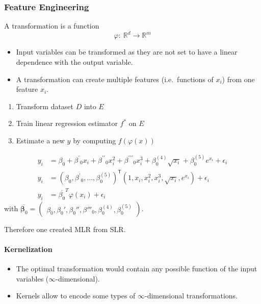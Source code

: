 \subsubsection{Feature Engineering}

A transformation is a function
\begin{equation*}
    \varphi{:}\:\mathbb{R}^d\to\mathbb{R}^m
\end{equation*}

\begin{itemize}
    \item Input variables can be transformed as they are not set to have a linear dependence with the output variable.
    \item A transformation can create multiple features (i.e.\ functions of $x_i$) from one feature $x_i$.
\end{itemize}


\begin{enumerate}
    \item Transform dataset $D$ into $E$
    \item Train linear regression estimator $f^*$ on $E$
    \item Estimate a new $y$ by computing $f(\varphi(x))$
\end{enumerate}


\noindent\begin{align*}
    y_i & =\beta_0+\beta^{\prime}{}_0x_i+\beta^{\prime\prime}{}_0x_i^2+\beta^{\prime\prime\prime}{}_0x_i^3+\beta_0^{(4)}\sqrt{x_i}+\beta_0^{(5)}e^{x_i}+\epsilon_i \\
    y_i & ={\left(\beta_0,\beta^{\prime}{}_0,\dots,\beta_0^{(5)}\right)}^{\mathsf{T}}\left(1,x_i,x_i^2,x_i^3,\sqrt{x_i},e^{x_i}\right)+\epsilon_i                  \\
    y_i & =\overline{\beta_0}^T\varphi(x_i)+\epsilon_i
\end{align*}
with $\overline{\boldsymbol{\beta}_0}=\begin{pmatrix}\beta_0,\beta_0',\beta_0'',\beta'''_0,\beta_0^{(4)},\beta_0^{(5)}\end{pmatrix}$. %

Therefore one created MLR from SLR.

\paragraph{Kernelization}
\begin{itemize}
    \item The optimal transformation would contain any possible function of the input variables ($\infty$-dimensional).
    \item Kernels allow to encode some types of $\infty$-dimensional transformations.
\end{itemize}

